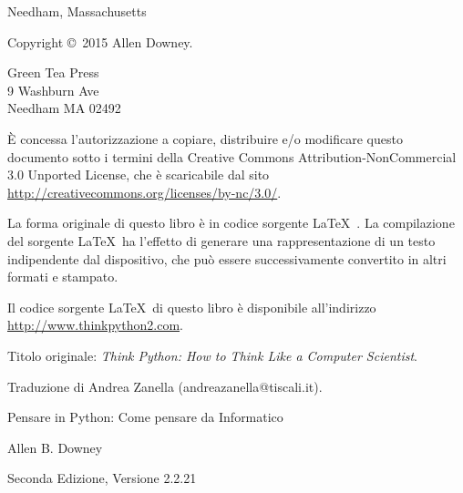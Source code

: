 \documentclass[10pt]{book}
\newcommand{\thetitle}{Pensare in Python: Come pensare da Informatico}
\newcommand{\theversion}{Seconda Edizione, Versione 2.2.21}
\newcommand{\thedate}{}
\begin{document}
\begin{latexonly}
\begin{flushright}
{\small Needham, Massachusetts}

\vfill

\end{flushright}


\pagebreak
\thispagestyle{empty}

{\small
Copyright \copyright ~2015 Allen Downey.


\vspace{0.2in}

\begin{flushleft}
Green Tea Press       \\
9 Washburn Ave        \\
Needham MA 02492
\end{flushleft}

È concessa l'autorizzazione a copiare, distribuire e/o modificare questo documento sotto i termini della Creative Commons Attribution-NonCommercial 3.0 Unported License, che è scaricabile dal sito \url{http://creativecommons.org/licenses/by-nc/3.0/}.

La forma originale di questo libro è in codice sorgente \LaTeX\ . La compilazione del sorgente \LaTeX\ ha l'effetto di generare una rappresentazione di un testo indipendente dal dispositivo, che può essere successivamente convertito in altri formati e stampato.

Il codice sorgente \LaTeX\ di questo libro è disponibile all'indirizzo
\url{http://www.thinkpython2.com}.

\vspace{0.2in}
Titolo originale: {\em Think Python: How to Think Like a Computer Scientist}.

Traduzione di Andrea Zanella (andreazanella@tiscali.it).


\vspace{0.2in}

} %

\end{latexonly}



\begin{htmlonly}


{\Large \thetitle}

{\large Allen B. Downey}

\theversion

\thedate

\setcounter{chapter}{-1}

\end{htmlonly}
\end{document}
